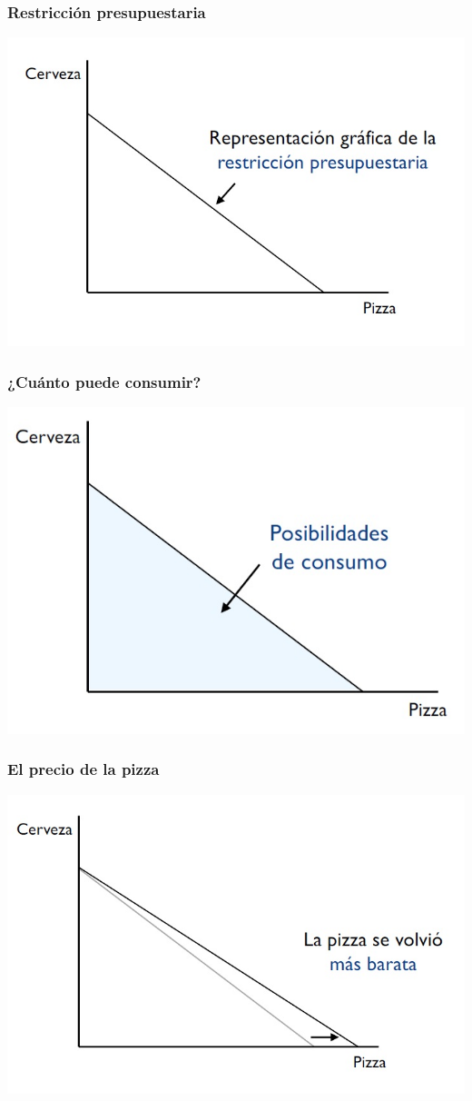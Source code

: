 \documentclass{beamer}
\begin{document}
\begin{frame}
\frametitle{Restricción presupuestaria}
\centering
\includegraphics[scale=0.6]{Slides Principios de Economia/Figures/Tema_02.4_rp2.jpg}
\end{frame}

\begin{frame}
\frametitle{¿Cuánto puede consumir?}
\centering
\includegraphics[scale=0.6]{Slides Principios de Economia/Figures/Tema_02.5_rp3.jpg}
\end{frame}

\begin{frame}
\frametitle{El precio de la pizza}
\centering
\includegraphics[scale=0.6]{Slides Principios de Economia/Figures/Tema_02.6_rp4.jpg}
\end{frame}
\end{document}
